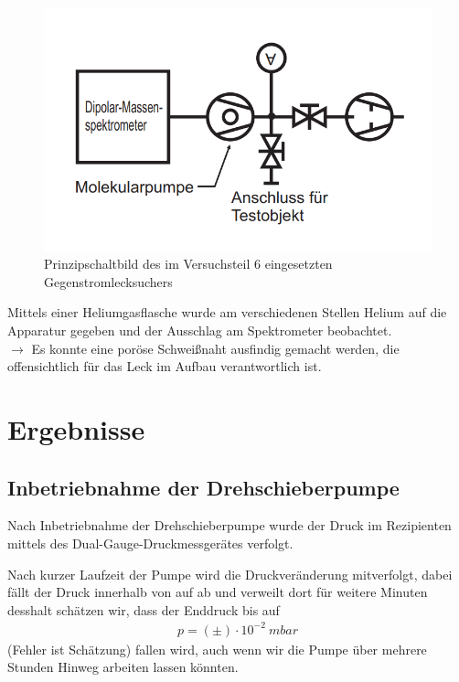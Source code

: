 \documentclass[12pt, a4paper]{scrartcl}
\begin{document}
		\begin{figure}[H]
			\centering
			\includegraphics[width=.3\paperwidth]{aufbau262}
			\caption{Prinzipschaltbild des im Versuchsteil 6 eingesetzten Gegenstromlecksuchers}
			\label{fig:anord6}
		\end{figure}
		Mittels einer Heliumgasflasche wurde am verschiedenen Stellen Helium auf die Apparatur gegeben und der Ausschlag am Spektrometer beobachtet.\\
		$\rightarrow$ Es konnte eine poröse Schweißnaht ausfindig gemacht werden, die offensichtlich für das Leck im Aufbau verantwortlich ist.

	\section{Ergebnisse}
	\subsection{Inbetriebnahme der Drehschieberpumpe}
	
		Nach Inbetriebnahme der Drehschieberpumpe wurde der Druck im Rezipienten mittels des Dual-Gauge-Druckmessgerätes verfolgt.
		
		Nach kurzer Laufzeit der Pumpe wird die Druckveränderung mitverfolgt, dabei fällt der Druck innerhalb von 
        auf 
        ab und verweilt dort für 
        weitere Minuten
		desshalt schätzen wir, dass der Enddruck bis auf
		\begin{align*}
			p=(\pm)\cdot 10^{-2}\ mbar
		\end{align*}
		(Fehler ist Schätzung) fallen wird, auch wenn wir die Pumpe über mehrere Stunden Hinweg arbeiten lassen könnten.
		
\end{document}

